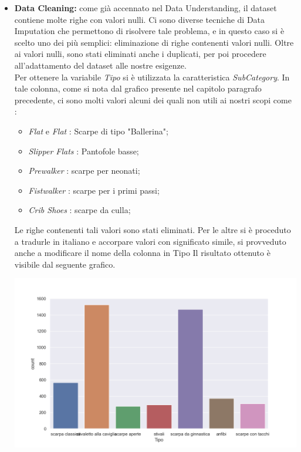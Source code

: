 \documentclass[a4paper, 11pt, oneside]{report}
\begin{document}
                \begin{itemize}
                    \item \textbf{Data Cleaning:} come già accennato nel Data Understanding, il dataset contiene molte righe con valori nulli.
                    Ci sono diverse tecniche di Data Imputation che permettono di risolvere tale problema,
                    e in questo caso si è scelto uno dei più semplici: eliminazione di righe contenenti valori nulli.
                    Oltre ai valori nulli, sono stati eliminati anche i duplicati, per poi procedere all'adattamento
                    del dataset alle nostre esigenze.\\
                    Per ottenere la variabile \emph{Tipo} si è utilizzata la caratteristica \emph{SubCategory}.
                    In tale colonna, come si nota dal grafico presente nel capitolo paragrafo precedente, ci sono molti valori
                    alcuni dei quali non utili ai nostri scopi come :
                    \begin{itemize}
                        \item \emph{Flat} e \emph{Flat} : Scarpe di tipo "Ballerina";
                        \item \emph{Slipper Flats} : Pantofole basse;
                        \item \emph{Prewalker} : scarpe per neonati;
                        \item \emph{Fistwalker} : scarpe per i primi passi;
                        \item \emph{Crib Shoes} : scarpe da culla;
                    \end{itemize}
                    Le righe contenenti tali valori sono stati eliminati.
                    Per le altre si è proceduto a tradurle in italiano e accorpare valori con significato simile,
                    si provveduto anche a modificare il nome della colonna in Tipo
                    Il risultato ottenuto è visibile dal seguente grafico.
                    \begin{center}
                        \includegraphics[scale=0.4]{countTipoShoes}

\end{center}
\end{itemize}
\end{document}
